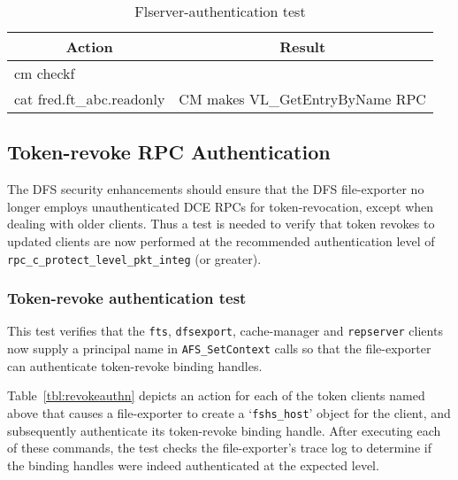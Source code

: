 
\begin{table}[h]
\begin{tabular}{|p{1.5in}|p{3.0in}|}
\hline
\multicolumn{1}{|c|}{Action} & \multicolumn{1}{c|}{Result} \\
%
\hline
{\raggedright cm checkf} & \\
%
\hline
{\raggedright cat fred.ft\_abc.readonly} &
{\raggedright CM makes VL\_GetEntryByName RPC} \\
%
\hline
\end{tabular}
\caption{Flserver-authentication test}
\label{tbl:flauthn}
\end{table}


\subsection{Token-revoke RPC Authentication}

The DFS security enhancements should ensure that the DFS file-exporter
no longer employs unauthenticated DCE RPCs for token-revocation, except when
dealing with older clients.
Thus a test is needed to verify that token revokes to updated clients
are now performed at the recommended authentication level
of {\tt rpc\_c\_protect\_level\_pkt\_integ} (or greater).

\subsubsection{Token-revoke authentication test}

This test verifies that the {\tt fts}, {\tt dfsexport}, cache-manager
and {\tt repserver} clients now supply a principal name
in {\tt AFS\_SetContext} calls so that the file-exporter can authenticate
token-revoke binding handles.

Table~\ref{tbl:revokeauthn} depicts an action for each of the token
clients named above that
causes a file-exporter to create a `{\tt fshs\_host}' object for
the client, and subsequently authenticate its token-revoke binding handle.
After executing each of these commands, the test checks the
file-exporter's trace log to determine if the binding handles
were indeed authenticated at the expected level.

